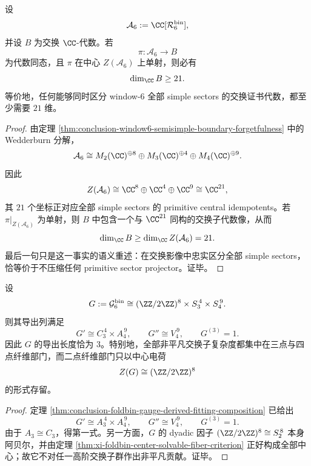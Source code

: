 \begin{theorem}\label{thm:conclusion-window6-commutative-shadow-dimension-lower-bound}
设
\[
\mathcal A_6:=\CC[\mathcal R_6^{\mathrm{bin}}],
\]
并设 \(B\) 为交换 \(\CC\)-代数。若
\[
\pi:\mathcal A_6\to B
\]
为代数同态，且 \(\pi\) 在中心 \(Z(\mathcal A_6)\) 上单射，则必有
\[
\dim_{\CC}B\ge 21.
\]
等价地，任何能够同时区分 window-\(6\) 全部 simple sectors 的交换证书代数，都至少需要 \(21\) 维。
\end{theorem}
\begin{proof}
由定理 \ref{thm:conclusion-window6-semisimple-boundary-forgetfulness} 中的 Wedderburn 分解，
\[
\mathcal A_6
\cong
M_2(\CC)^{\oplus 8}\oplus M_3(\CC)^{\oplus 4}\oplus M_4(\CC)^{\oplus 9}.
\]
因此
\[
Z(\mathcal A_6)
\cong
\CC^{8}\oplus \CC^{4}\oplus \CC^{9}
\cong
\CC^{21},
\]
其 \(21\) 个坐标正对应全部 simple sectors 的 primitive central idempotents。若 \(\pi|_{Z(\mathcal A_6)}\) 为单射，则 \(B\) 中包含一个与 \(\CC^{21}\) 同构的交换子代数像，从而
\[
\dim_{\CC}B\ge \dim_{\CC}Z(\mathcal A_6)=21.
\]
最后一句只是这一事实的语义重述：在交换影像中忠实区分全部 simple sectors，恰等价于不压缩任何 primitive sector projector。证毕。
\end{proof}

\begin{corollary}\label{cor:conclusion-window6-commutator-support-nondyadic}
设
\[
G:=\mathcal G_6^{\mathrm{bin}}
\cong
(\ZZ/2\ZZ)^8\times S_3^{\,4}\times S_4^{\,9}.
\]
则其导出列满足
\[
G'
\cong
C_3^{\,4}\times A_4^{\,9},
\qquad
G''
\cong
V_4^{\,9},
\qquad
G^{(3)}=1.
\]
因此 \(G\) 的导出长度恰为 \(3\)。特别地，全部非平凡交换子复杂度都集中在三点与四点纤维部门，而二点纤维部门只以中心电荷
\[
Z(G)\cong (\ZZ/2\ZZ)^8
\]
的形式存留。
\end{corollary}
\begin{proof}
定理 \ref{thm:conclusion-foldbin-gauge-derived-fitting-composition} 已给出
\[
G'
\cong
A_3^{\,4}\times A_4^{\,9},
\qquad
G''
\cong
V_4^{\,9},
\qquad
G^{(3)}=1.
\]
由于 \(A_3\cong C_3\)，得第一式。另一方面，\(G\) 的 dyadic 因子 \((\ZZ/2\ZZ)^8\cong S_2^{\,8}\) 本身阿贝尔，并由定理 \ref{thm:xi-foldbin-center-solvable-fiber-criterion} 正好构成全部中心；故它不对任一高阶交换子群作出非平凡贡献。证毕。
\end{proof}





